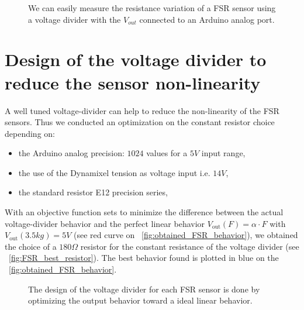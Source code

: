 \begin{figure}[!h]
\centering
    \hfil
    \caption{We can easily measure the resistance variation of a FSR sensor using a voltage divider with the $V_{out}$ connected to an Arduino analog port.}
    \label{fig:test_sensors}
\end{figure}

\section{Design of the voltage divider to reduce the sensor non-linearity} %

A well tuned voltage-divider can help to reduce the non-linearity of the FSR sensors. Thus we conducted an optimization on the constant resistor choice depending on:
\begin{itemize}
    \item the Arduino analog precision: $1024$ values for a $5V$ input range,
    \item the use of the Dynamixel tension as voltage input i.e. $14V$,
    \item the standard resistor E12 precision series,
\end{itemize}

With an objective function sets to minimize the difference between the actual voltage-divider behavior and the perfect linear behavior $V_\mathrm{out}(F) = \alpha \cdot F$ with $V_\mathrm{out}(3.5kg) = 5V$ (see red curve on \figurename~\ref{fig:obtained_FSR_behavior}), we obtained the choice of a $180\Omega$ resistor for the constant resistance of the voltage divider (see \figurename~\ref{fig:FSR_best_resistor}). The best behavior found is plotted in blue on the \figurename~\ref{fig:obtained_FSR_behavior}.

\begin{figure}[h]
\centering
    \hfil
    \caption{The design of the voltage divider for each FSR sensor is done by optimizing the output behavior toward a ideal linear behavior.}
    \label{fig:foot_sensor_behavior}
\end{figure}
